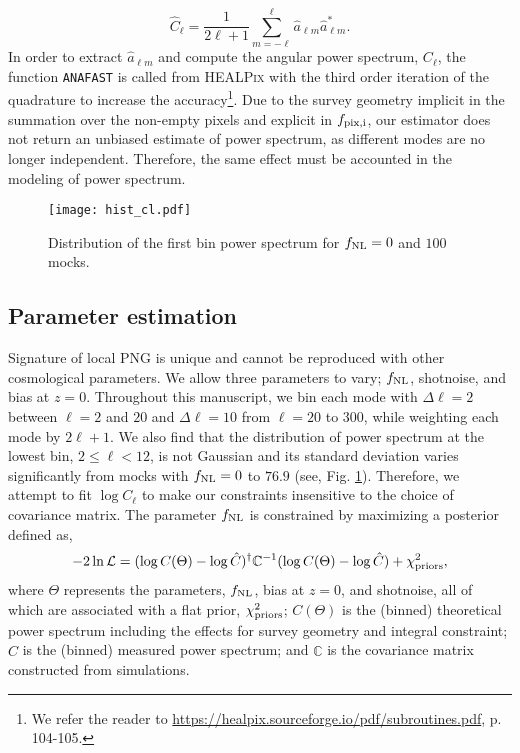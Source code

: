 \begin{equation}\label{eq:pusedocell}
        \hat{C}_{\ell} = \frac{1}{2\ell +1} \sum_{m=-\ell}^{\ell} \hat{a}_{\ell m} \hat{a}^{*}_{\ell m}.
\end{equation}
In order to extract $\hat{a}_{\ell m}$  and compute the angular power spectrum, $C_{\ell}$, the function \texttt{ANAFAST} is called from \textsc{HEALPix} \citep{gorski2005healpix} with the third order iteration of the quadrature to increase the accuracy\footnote{We refer the reader to \url{https://healpix.sourceforge.io/pdf/subroutines.pdf}, p. 104-105.}. Due to the survey geometry implicit in the summation over the non-empty pixels and explicit in $f_{\rm pix, i}$, our estimator does not return an unbiased estimate of power spectrum, as different modes are no longer independent. Therefore, the same effect must be accounted in the modeling of power spectrum.

\begin{figure}
\centering
\texttt{[image: hist\_cl.pdf]}
\caption{Distribution of the first bin power spectrum for $f_{\rm NL}=0$ and $100$ mocks.}\label{fig:histcell}
\end{figure}


\subsection{Parameter estimation}
Signature of local PNG is unique and cannot be reproduced with other cosmological parameters. We allow three parameters to vary; $f_{\rm NL}$, shotnoise, and bias at $z=0$. Throughout this manuscript, we bin each mode with $\Delta\ell=2$ between $\ell=2$ and $20$ and $\Delta \ell=10$ from $\ell=20$ to $300$, while weighting each mode by $2\ell+1$. We also find that the distribution of power spectrum at the lowest bin, $2\leq \ell < 12$,  is not Gaussian and its standard deviation varies significantly from mocks with $f_{\rm NL}=0$ to $76.9$ (see, Fig. \ref{fig:histcell}). Therefore, we attempt to fit $\log C_{\ell}$ to make our constraints insensitive to the choice of covariance matrix. The parameter $f_{\rm NL}$ is constrained by maximizing a posterior defined as,
\begin{equation}
-2\ln\mathcal{L} = (\log C(\Theta)-\log \hat{C})^{\dagger} \mathbb{C}^{-1} (\log C(\Theta)-\log \hat{C}) + \chi^{2}_{\rm priors},
\end{equation}
where $\Theta$ represents the parameters, $f_{\rm NL}$, bias at $z=0$, and shotnoise, all of which are associated with a flat prior, $\chi^{2}_{\rm priors}$; $C(\Theta)$ is the (binned) theoretical power spectrum including the effects for survey geometry and integral constraint; $\hat{C}$ is the (binned) measured power spectrum; and $\mathbb{C}$ is the covariance matrix constructed from simulations. 

